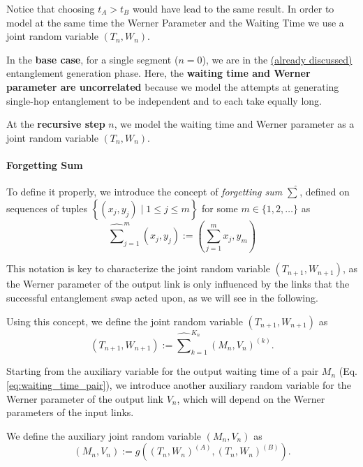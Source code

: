 \documentclass{masterthesis}
\begin{document}
Notice that choosing $t_{A} > t_{B}$ would have lead to the same result.
In order to model at the same time the Werner Parameter and the Waiting Time we use a joint random variable $(T_n, W_n)$.

In the \textbf{base case}, for a single segment ($n=0$), we are in the \hyperref[subsection:werner_parameter_gen]{(already discussed)} entanglement generation phase.
Here, the \textbf{waiting time and Werner parameter are uncorrelated} because we model the attempts at generating single-hop entanglement to be independent and to each take equally long. 

At the \textbf{recursive step} $n$, we model the waiting time and Werner parameter as a joint random variable $(T_n, W_n)$.

\paragraph*{Forgetting Sum} To define it properly, we introduce the concept of \textit{forgetting sum} $\widehat{\sum}$, defined on sequences of tuples $\left\{\left(x_{j}, y_{j}\right) \mid 1 \leq j \leq m\right\}$ for some $m \in\{1,2, \ldots\}$ as
\begin{equation}\label{eq:forgetting_sum}
    \widehat{\sum}_{j=1}^{m}\left(x_{j}, y_{j}\right):=\left(\sum_{j=1}^{m} x_{j}, y_{m}\right)
\end{equation}

This notation is key to characterize the joint random variable $(T_{n+1}, W_{n+1})$, as the Werner parameter of the output link is only influenced by the links that the successful entanglement swap acted upon, as we will see in the following.

Using this concept, we define the joint random variable $(T_{n+1}, W_{n+1})$ as
\begin{equation}\label{eq:joint_random_variable}
    (T_{n+1}, W_{n+1}) := \widehat{\sum}_{k=1}^{K_n} (M_n, V_n)^{(k)}.
\end{equation}

Starting from the auxiliary variable for the output waiting time of a pair $M_n$ (Eq. \ref{eq:waiting_time_pair}), we introduce another auxiliary random variable for the Werner parameter of the output link $V_n$, which will depend on the Werner parameters of the input links. 

We define the auxiliary joint random variable $(M_n, V_n)$ as
\begin{equation}
    (M_n, V_n) := g\left((T_n, W_n)^{(A)}, (T_n, W_n)^{(B)}\right).
\end{equation}
\end{document}
